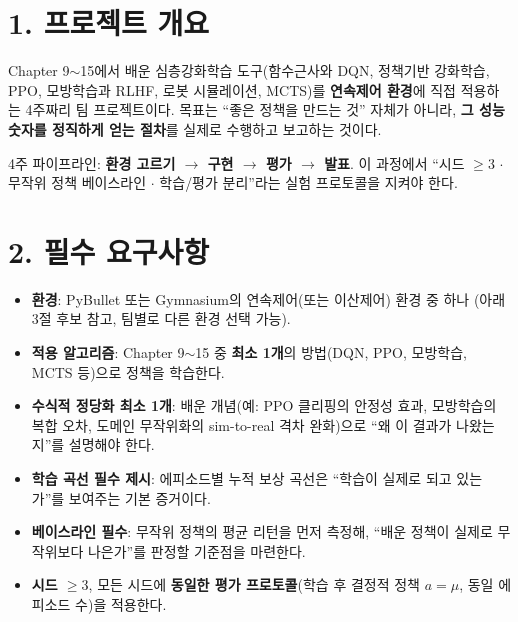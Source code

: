 \documentclass[12pt]{article}
\begin{document}

\section*{1. 프로젝트 개요}
Chapter 9$\sim$15에서 배운 심층강화학습 도구(함수근사와 DQN, 정책기반
강화학습, PPO, 모방학습과 RLHF, 로봇 시뮬레이션, MCTS)를 \textbf{연속제어
환경}에 직접 적용하는 4주짜리 팀 프로젝트이다. 목표는 ``좋은 정책을
만드는 것'' 자체가 아니라, \textbf{그 성능 숫자를 정직하게 얻는 절차}를
실제로 수행하고 보고하는 것이다.

\vspace{4pt}
\noindent 4주 파이프라인: \textbf{환경 고르기 $\to$ 구현 $\to$ 평가 $\to$
발표}. 이 과정에서 ``시드 $\ge 3$ $\cdot$ 무작위 정책 베이스라인 $\cdot$
학습/평가 분리''라는 실험 프로토콜을 지켜야 한다.

\section*{2. 필수 요구사항}
\begin{itemize}
\item \textbf{환경}: PyBullet 또는 Gymnasium의 연속제어(또는 이산제어)
  환경 중 하나 (아래 3절 후보 참고, 팀별로 다른 환경 선택 가능).
\item \textbf{적용 알고리즘}: Chapter 9$\sim$15 중 \textbf{최소 1개}의
  방법(DQN, PPO, 모방학습, MCTS 등)으로 정책을 학습한다.
\item \textbf{수식적 정당화 최소 1개}: 배운 개념(예: PPO 클리핑의
  안정성 효과, 모방학습의 복합 오차, 도메인 무작위화의 sim-to-real
  격차 완화)으로 ``왜 이 결과가 나왔는지''를 설명해야 한다.
\item \textbf{학습 곡선 필수 제시}: 에피소드별 누적 보상 곡선은 ``학습이
  실제로 되고 있는가''를 보여주는 기본 증거이다.
\item \textbf{베이스라인 필수}: 무작위 정책의 평균 리턴을 먼저 측정해,
  ``배운 정책이 실제로 무작위보다 나은가''를 판정할 기준점을 마련한다.
\item \textbf{시드 $\ge 3$}, 모든 시드에 \textbf{동일한 평가
  프로토콜}(학습 후 결정적 정책 $a=\mu$, 동일 에피소드 수)을 적용한다.
\end{itemize}

\newpage
\end{document}
